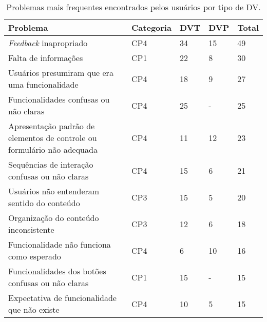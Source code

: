 \begin{table}[htb]
  \begin{center}
    \ABNTEXfontereduzida
    \caption{Problemas mais frequentes encontrados pelos usuários por tipo de DV.}
    \label{tab-pro-blind-1}
    \begin{tabular}{p{10.5cm}|p{1.4cm}|p{0.6cm}|p{0.6cm}|p{0.7cm}}
      \textbf{Problema}                                                       & \textbf{Categoria} & \textbf{DVT} & \textbf{DVP} & \textbf{Total} \\
      \hline
      \emph{Feedback} inapropriado                                            & CP4                & 34           & 15           & 49             \\
      \hline
      Falta de informações                                                    & CP1                & 22           & 8            & 30             \\
      \hline
      Usuários presumiram que era uma funcionalidade                          & CP4                & 18           & 9            & 27             \\
      \hline
      Funcionalidades confusas ou não claras                                  & CP4                & 25           & -            & 25             \\
      \hline
      Apresentação padrão de elementos de controle ou formulário não adequada & CP4                & 11           & 12           & 23             \\
      \hline
      Sequências de interação confusas ou não claras                          & CP4                & 15           & 6            & 21             \\
      \hline
      Usuários não entenderam sentido do conteúdo                             & CP3                & 15           & 5            & 20             \\
      \hline
      Organização do conteúdo inconsistente                                   & CP3                & 12           & 6            & 18             \\
      \hline
      Funcionalidade não funciona como esperado                               & CP4                & 6            & 10           & 16             \\
      \hline
      Funcionalidades dos botões confusas ou não claras                       & CP1                & 15           & -            & 15             \\
      \hline
      Expectativa de funcionalidade que não existe                            & CP4                & 10           & 5            & 15             \\

\end{tabular}
\end{center}
\end{table}

